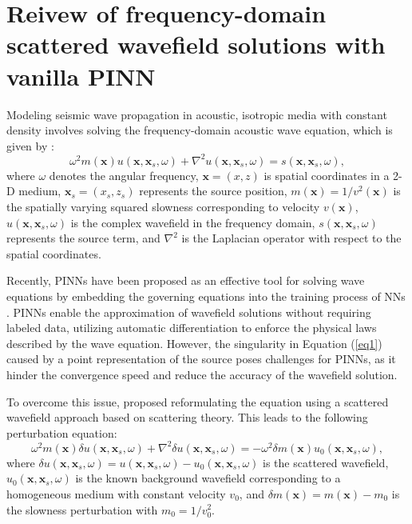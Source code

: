 \section{\textbf{Reivew of frequency-domain scattered wavefield solutions with vanilla PINN}}\label{method_review}
Modeling seismic wave propagation in acoustic, isotropic media with constant density involves solving the frequency-domain acoustic wave equation, which is given by \citep{Aki1980QuantitativeST}: 
\begin{equation}\label{eq1} 
\omega^2 m(\mathbf{x}) u (\mathbf{x},\mathbf{x}_s,\omega) +  
\nabla^2 u (\mathbf{x},\mathbf{x}_s,\omega) = s(\mathbf{x},\mathbf{x}_s,\omega),
\end{equation} 
where $\omega$ denotes the angular frequency, $\mathbf{x} = (x,z)$ is spatial coordinates in a 2-D medium, $\mathbf{x}_s=(x_s,z_s)$ represents the source position, $m(\mathbf{x}) = 1/v^2(\mathbf{x})$ is the spatially varying squared slowness corresponding to velocity $v(\mathbf{x})$, $u(\mathbf{x}, \mathbf{x}_s,\omega)$ is the complex wavefield in the frequency domain, $s(\mathbf{x},\mathbf{x}_s,\omega)$ represents the source term, and $\nabla^2$ is the Laplacian operator with respect to the spatial coordinates. 

Recently, PINNs have been proposed as an effective tool for solving wave equations by embedding the governing equations into the training process of NNs \citep{raissi2019physics}. PINNs enable the approximation of wavefield solutions without requiring labeled data, utilizing automatic differentiation to enforce the physical laws described by the wave equation. However, the singularity in Equation (\ref{eq1}) caused by a point representation of the source poses challenges for PINNs, as it hinder the convergence speed and reduce the accuracy of the wavefield solution. 

To overcome this issue, \cite{alkhalifah2021wavefield} proposed reformulating the equation using a scattered wavefield approach based on scattering theory. This leads to the following perturbation equation:
\begin{equation}\label{eq2} 
\omega^2 m(\mathbf{x}) \delta u(\mathbf{x},\mathbf{x}_s,\omega) + \nabla^2 \delta u(\mathbf{x},\mathbf{x}_s,\omega) = -\omega^2 \delta m(\mathbf{x}) u_0(\mathbf{x},\mathbf{x}_s,\omega), 
\end{equation}
where $\delta u(\mathbf{x},\mathbf{x}_s,\omega) = u(\mathbf{x},\mathbf{x}_s,\omega) - u_0(\mathbf{x},\mathbf{x}_s,\omega)$ is the scattered wavefield, $u_0(\mathbf{x},\mathbf{x}_s,\omega)$ is the known background wavefield corresponding to a homogeneous medium with constant velocity $v_0$, and $\delta m(\mathbf{x}) = m(\mathbf{x}) - m_0$ is the slowness perturbation with $m_0 = 1/v_0^2$. 

